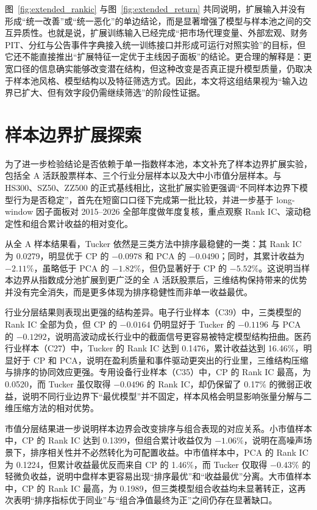 图~\ref{fig:extended_rankic} 与图~\ref{fig:extended_return} 共同说明，扩展输入并没有形成“统一改善”或“统一恶化”的单边结论，而是显著增强了模型与样本池之间的交互异质性。也就是说，扩展训练输入已经完成“把市场代理变量、外部宏观、财务 PIT、分红与公告事件字典接入统一训练接口并形成可运行对照实验”的目标，但它还不能直接推出“扩展特征一定优于主线因子面板”的结论。更合理的解释是：更宽口径的信息确实能够改变潜在结构，但这种改变是否真正提升模型质量，仍取决于样本池风格、模型结构以及特征筛选方式。因此，本文将这组结果视为“输入边界已扩大、但有效字段仍需继续筛选”的阶段性证据。

\section{样本边界扩展探索}

为了进一步检验结论是否依赖于单一指数样本池，本文补充了样本边界扩展实验，包括全 A 活跃股票样本、三个行业分层样本以及大中小市值分层样本。与 HS300、SZ50、ZZ500 的正式基线相比，这批扩展实验更强调“不同样本边界下模型行为是否稳定”，首先在短窗口口径下完成第一批比较，并进一步基于 long-window 因子面板对 2015--2026 全部年度做年度复核，重点观察 Rank IC、滚动稳定性和组合累计收益的相对变化。

从全 A 样本结果看，Tucker 依然是三类方法中排序最稳健的一类：其 Rank IC 为 0.0279，明显优于 CP 的 $-0.0978$ 和 PCA 的 $-0.0490$；同时，其累计收益为 $-2.11\%$，虽略低于 PCA 的 $-1.82\%$，但仍显著好于 CP 的 $-5.52\%$。这说明当样本边界从指数成分池扩展到更广泛的全 A 活跃股票后，三维结构保持带来的优势并没有完全消失，而是更多体现为排序稳健性而非单一收益最优。

行业分层结果则表现出更强的结构差异。电子行业样本（C39）中，三类模型的 Rank IC 全部为负，但 CP 的 $-0.0164$ 仍明显好于 Tucker 的 $-0.1196$ 与 PCA 的 $-0.1292$，说明高波动成长行业中的截面信号更容易被特定模型结构扭曲。医药行业样本（C27）中，Tucker 的 Rank IC 达到 0.1476，累计收益达到 16.46\%，明显好于 CP 和 PCA，说明在盈利质量和事件驱动更突出的行业里，三维结构压缩与排序的协同效应更强。专用设备行业样本（C35）中，CP 的 Rank IC 最高，为 0.0520，而 Tucker 虽仅取得 $-0.0496$ 的 Rank IC，却仍保留了 0.17\% 的微弱正收益，说明不同行业边界下“最优模型”并不固定，样本风格会明显影响张量分解与二维压缩方法的相对优势。

市值分层结果进一步说明样本边界会改变排序与组合表现的对应关系。小市值样本中，CP 的 Rank IC 达到 0.1399，但组合累计收益仅为 $-1.06\%$，说明在高噪声场景下，排序相关性并不必然转化为可配置收益。中市值样本中，PCA 的 Rank IC 为 0.1224，但累计收益最优反而来自 CP 的 1.46\%，而 Tucker 仅取得 $-0.43\%$ 的轻微负收益，说明中盘样本更容易出现“排序最优”和“收益最优”分离。大市值样本中，CP 的 Rank IC 最高，为 0.1989，但三类模型组合收益均未显著转正，这再次表明“排序指标优于同业”与“组合净值最终为正”之间仍存在显著缺口。

